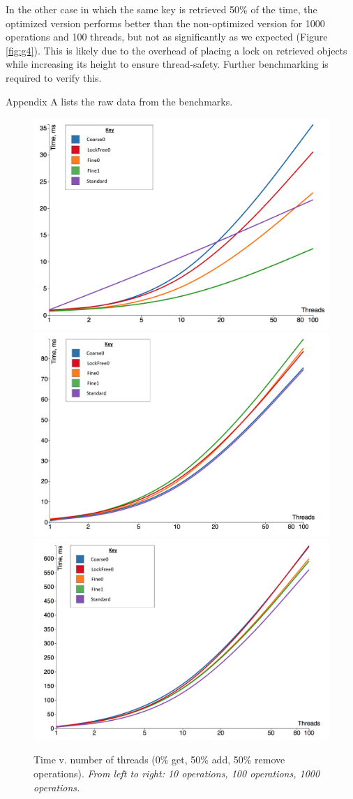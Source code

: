 \documentclass[12pt,oneline,a4paper]{ouparticle}
\begin{document}
In the other case in which the same key is retrieved 50\% of the time, the optimized version performs better than the non-optimized version for 1000 operations and 100 threads, but not as significantly as we expected (Figure \ref{fig:g4}). This is likely due to the overhead of placing a lock on retrieved objects while increasing its height to ensure thread-safety. Further benchmarking is required to verify this.

Appendix A lists the raw data from the benchmarks.

\begin{figure}
    \centering
    \hspace*{-2.25cm}
    \includegraphics[width=0.37\linewidth]{1}\hspace{0em}
    \includegraphics[width=0.37\linewidth]{2}\hspace{0em}
    \includegraphics[width=0.37\linewidth]{3}
    \hspace*{-2.25cm}
    \centering
    \caption{Time v. number of threads (0\% get, 50\% add, 50\% remove operations).\newline{}
    {\it From left to right: 10 operations, 100 operations, 1000 operations.}}
    \label{fig:g1}
\end{figure}
\end{document}
